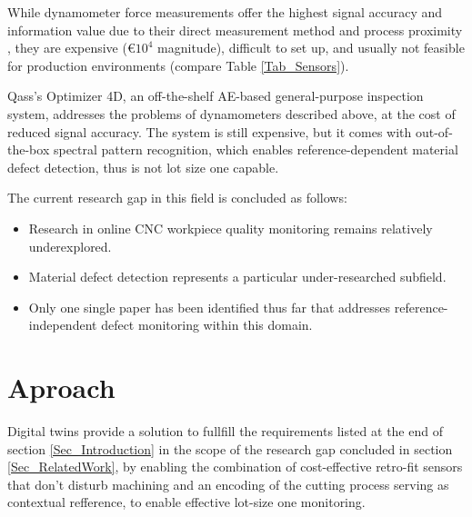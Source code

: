\documentclass[5p,times,procedia]{elsarticle}
\begin{document}
While dynamometer force measurements offer the highest signal accuracy and information value due to their direct measurement method and process proximity \cite[]{Korkmaz.Yasar.ea2020}, they are expensive (\euro $10^4$ magnitude), difficult to set up, and usually not feasible for production environments (compare Table \ref{Tab_Sensors}).

Qass's Optimizer 4D, an off-the-shelf AE-based general-purpose inspection system, addresses the problems of dynamometers described above, at the cost of reduced signal accuracy. The system is still expensive, but it comes with out-of-the-box spectral pattern recognition, which enables reference-dependent material defect detection, thus is not lot size one capable. \cite[p.5]{Szulewski.Sniegulska-Gradzka2017}

\vspace*{.5\baselineskip}
\noindent The current research gap in this field is concluded as follows: \label{gap}
\vspace*{-\baselineskip}
\begin{itemize}
	\item Research in online CNC workpiece quality monitoring remains relatively underexplored.
	\item Material defect detection represents a particular under-researched subfield.
	\item Only one single paper has been identified thus far that addresses reference-independent defect monitoring within this domain. %
\end{itemize}










\section{Aproach}\label{Sec_Aproach}

Digital twins provide a solution to fullfill the requirements listed at the end of section \ref{Sec_Introduction} in the scope of the research gap concluded in section \ref{Sec_RelatedWork}, by enabling the combination of cost-effective retro-fit sensors that don't disturb machining and an encoding of the cutting process serving as contextual refference, to enable effective lot-size one monitoring.
\end{document}
